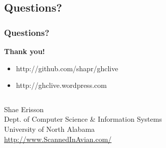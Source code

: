 \documentclass[xcolor=pdftex,dvipsnames,table]{beamer}
\begin{document}
\subsection{Questions?}
\begin{frame}[plain]
  \label{thanks}
  \frametitle{Questions?}
  \begin{center}
    \textbf{Thank you!}
  \end{center}
  \begin{itemize}
  \item http://github.com/shapr/ghclive
  \item http://ghclive.wordpress.com
  \end{itemize}
  \vspace{0.5cm}
  \begin{center}
    \begin{minipage}{11cm}
      \begin{columns}[c]
        Shae Erisson\\
        Dept. of Computer Science \& Information Systems\\
        University of North Alabama\\
        \url{http://www.ScannedInAvian.com/}
      \end{columns}
    \end{minipage}
  \end{center}
\end{frame}


\end{document}
